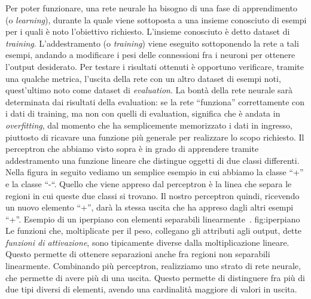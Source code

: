 Per poter funzionare, una rete neurale ha bisogno di una fase di apprendimento (o \textit{learning}), durante la quale viene sottoposta a una insieme conosciuto di esempi per i quali è noto l’obiettivo richiesto. L’insieme conosciuto è detto dataset di \textit{training}. L’addestramento (o \textit{training}) viene eseguito sottoponendo la rete a tali esempi, andando a modificare i pesi delle connessioni fra i neuroni per ottenere l’output desiderato. Per testare i risultati ottenuti è opportuno verificare, tramite una qualche metrica, l’uscita della rete con un altro dataset di esempi noti, quest’ultimo noto come dataset di \textit{evaluation}. La bontà della rete neurale sarà determinata dai risultati della evaluation: se la rete “funziona” correttamente con i dati di training, ma non con quelli di evaluation, significa che è andata in \textit{overfitting}, dal momento che ha semplicemente memorizzato i dati in ingresso, piuttosto di ricavare una funzione più generale per realizzare lo scopo richiesto.
Il perceptron che abbiamo visto sopra è in grado di apprendere tramite addestramento una funzione lineare che distingue oggetti di due classi differenti. Nella figura in seguito vediamo un semplice esempio in cui abbiamo la classe “+” e la classe “-“. Quello che viene appreso dal perceptron è la linea che separa le regioni in cui queste due classi si trovano. Il nostro perceptron quindi, ricevendo un nuovo elemento “+”, darà la stessa uscita che ha appreso dagli altri esempi “+”.
{Esempio di un iperpiano con elementi separabili linearmente~\cite{witten}.}
{fig:iperpiano}
Le funzioni che, moltiplicate per il peso, collegano gli attributi agli output, dette \textit{funzioni di attivazione}, sono tipicamente diverse dalla moltiplicazione lineare. Questo permette di ottenere separazioni anche fra regioni non separabili linearmente. Combinando più perceptron, realizziamo uno strato di rete neurale, che permette di avere più di una uscita. Questo permette di distinguere fra più di due tipi diversi di elementi, avendo una cardinalità maggiore di valori in uscita.
